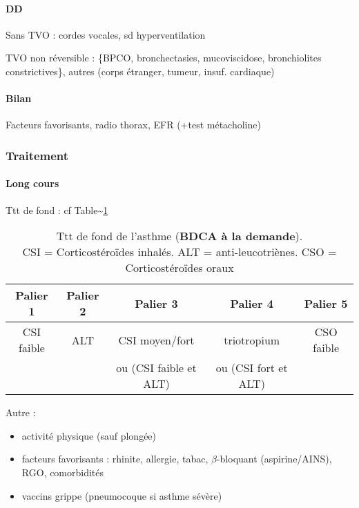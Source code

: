 \documentclass[11pt]{article}
\begin{document}
\paragraph{DD}
\label{sec:org203ca70}
Sans TVO : cordes vocales, sd hyperventilation

TVO non réversible : \{BPCO, bronchectasies, mucoviscidose, bronchiolites
constrictives\}, autres (corps étranger, tumeur, insuf. cardiaque)
\paragraph{Bilan}
\label{sec:orga0661b7}
Facteurs favorisants, radio thorax, EFR (+test métacholine)

\subsubsection{Traitement}
\label{sec:org524a280}

\paragraph{Long cours}
\label{sec:orgb0cd558}
Ttt de fond : cf Table\textasciitilde{}\ref{tab:ttt_asthme}

\begin{table}
  \centering
  \begin{tabular}{ccccc}
    \toprule
    Palier 1 & Palier 2 & Palier 3 & Palier 4 & Palier 5 \\
    \midrule
    CSI faible & ALT & CSI moyen/fort & triotropium & CSO faible\\
             & & ou (CSI faible et ALT) & ou (CSI fort et ALT) &\\
  \bottomrule                                                              
  \end{tabular}
  \caption{Ttt de fond de l'asthme (\textbf{BDCA à la demande}).\\
    CSI = Corticostéroïdes inhalés. ALT =
    anti-leucotriènes. CSO = Corticostéroïdes oraux}
  \label{tab:ttt_asthme}
\end{table}

Autre : 

\begin{itemize}
\item activité physique (sauf plongée)
\item facteurs favorisants : rhinite, allergie, tabac, \(\beta\)-bloquant
(aspirine/AINS), RGO, comorbidités
\item vaccins grippe (pneumocoque si asthme sévère)
\end{itemize}
\end{document}
